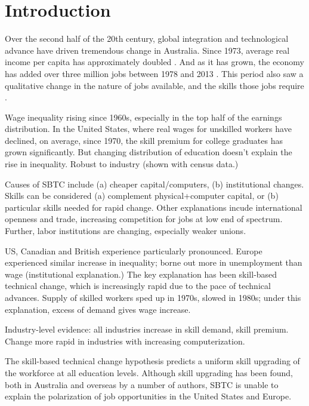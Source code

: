 \chapter{Introduction}

Over the second half of the 20th century, global integration and technological advance have driven tremendous change in Australia. Since 1973, average real income per capita has approximately doubled \citep{NA20124}. And as it has grown, the economy has added over three million jobs between 1978 and 2013 \citep{LFSApr2013}. This period also saw a qualitative change in the nature of jobs available, and the skills those jobs require \citep{Esposto2012a}.


Wage inequality rising since 1960s, especially in the top half of the earnings distribution. In the United States, where real wages for unskilled workers have declined, on average, since 1970, the skill premium for college graduates has grown significantly. But changing distribution of education doesn't explain the rise in inequality. Robust to industry (shown with census data.)

Causes of SBTC include (a) cheaper capital/computers, (b) institutional changes. Skills can be considered (a) complement physical+computer capital, or (b) particular skills needed for rapid change. Other explanations incude international openness and trade, increasing competition for jobs at low end of spectrum. Further, labor institutions are changing, especially weaker unions.
                
US, Canadian and British experience particularly pronounced. Europe experienced similar increase in inequality; borne out more in unemployment than wage (institutional explanation.) The key explanation has been skill-based technical change, which is increasingly rapid due to the pace of technical advances. Supply of skilled workers sped up in 1970s, slowed in 1980s; under this explanation, excess of demand gives wage increase.

Industry-level evidence: all industries increase in skill demand, skill premium. Change more rapid in industries with increasing computerization.

The skill-based technical change hypothesis predicts a uniform skill upgrading of the workforce at all education levels. Although skill upgrading has been found, both in Australia \citet{Esposto2012}\citet{Wooden2000}\citet{Cully1999} and overseas \citet{Autor2008} by a number of authors, SBTC is unable to explain the polarization of job opportunities in the United States and Europe.

